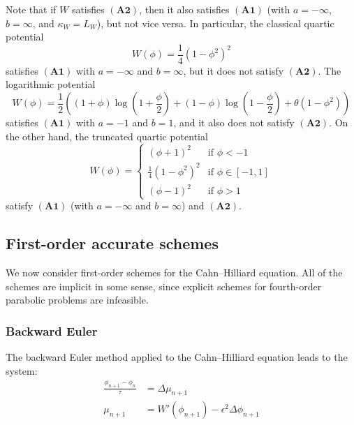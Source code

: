 \documentclass{article}
\begin{document}
Note that if $W$ satisfies $\mathbf{(A2)}$, then it also satisfies $\mathbf{(A1)}$ (with $a = -\infty$, $b = \infty$, and $\kappa_W = L_W$), but not vice versa. In particular, the classical quartic potential
\begin{equation}
    W(\phi) = \frac{1}{4}(1 - \phi^2)^2
\end{equation}
satisfies $\mathbf{(A1)}$ with $a = -\infty$ and $b = \infty$, but it does not satisfy $\mathbf{(A2)}$. The logarithmic potential
\begin{equation}
    W(\phi) = \frac{1}{2}\left((1 + \phi)\log\left(1 + \frac{\phi}{2}\right) + (1 - \phi)\log\left(1 - \frac{\phi}{2}\right) + \theta(1 - \phi^2)\right)
\end{equation}
satisfies $\mathbf{(A1)}$ with $a = -1$ and $b = 1$, and it also does not satisfy $\mathbf{(A2)}$. On the other hand, the truncated quartic potential
\begin{equation}
    W(\phi) = \begin{cases}
        (\phi + 1)^2 & \text{if } \phi < -1 \\
        \frac{1}{4}(1 - \phi^2)^2 & \text{if } \phi \in [-1, 1] \\
        (\phi - 1)^2 & \text{if } \phi > 1
    \end{cases}
\end{equation}
 satisfy  $\mathbf{(A1)}$ (with $a = -\infty$ and $b = \infty$) and $\mathbf{(A2)}$.

\subsection{First-order accurate schemes}

We now consider first-order schemes for the Cahn--Hilliard equation. All of the schemes are implicit in some sense, since explicit schemes for fourth-order parabolic problems are infeasible.

\subsubsection{Backward Euler}

The backward Euler method applied to the Cahn--Hilliard equation leads to the system:
\begin{align}
    \frac{\phi_{n+1} - \phi_n}{\tau} &= \Delta \mu_{n+1} \\
    \mu_{n+1} &= W'(\phi_{n+1}) - \epsilon^2 \Delta \phi_{n+1}
\end{align}
\end{document}
